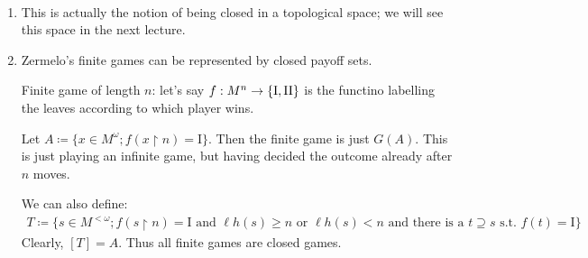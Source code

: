 \documentclass[]{article}
\newcommand{\I}{\textrm{I}}
\newcommand{\II}{\textrm{II}}
\newcommand{\om}{\omega}
\newcommand{\lom}{{<\omega}}
\newcommand{\lh}{\ell h}
\begin{document}
\begin{remark*}[Remarks]\ 
    \begin{enumerate}
        \item This is actually the notion of being closed in a topological space; we will see this space in the next lecture.
        \item Zermelo's finite games can be represented by closed payoff sets.
        
        Finite game of length $n$: let's say $f:M^n\ra \{\I,\II\}$ is the functino labelling the leaves according to which player wins.

        Let $A\coloneq \{x\in M^\om ; f(x\restriction n) = \I\}$. Then the finite game is just $G(A)$. This is just playing an infinite game, but having decided the outcome already after $n$ moves.

        We can also define:
        \begin{align*}
            T\coloneqq \{s\in M^\lom; f(s\restriction n) = \I\textrm{ and }\lh(s)\ge n \textrm{ or }\lh(s) < n\textrm{ and there is a }t\supseteq s \textrm{ s.t. } f(t)=\I\}
        \end{align*}
        Clearly, $[T] = A$. Thus all finite games are closed games.
    \end{enumerate}
\end{remark*}
\end{document}
